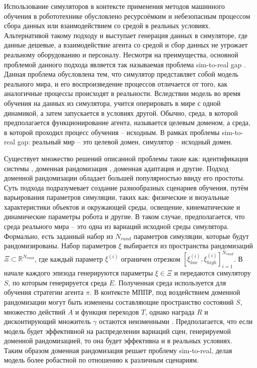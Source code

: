     Использование симуляторов в контексте применения методов машинного
    обучения в робототехнике обусловлено ресурсоёмким и небезопасным
    процессом сбора данных или взаимодействием со средой в реальных условиях. Альтернативой такому подходу и выступает генерация данных в симуляторе, где данные дешевые, а взаимодействие агента со средой и сбор данных не угрожает реальному оборудованию и персоналу. Несмотря на преимущества, основной проблемой данного подхода является так называемая проблема sim-to-real gap \cite{he2023bridging}. Данная проблема обусловлена тем, что симулятор представляет собой модель реального мира, и его воспроизведение процессов отличается от того, как аналогичные процессы происходят в реальности. Вследствии модель во время обучения на данных из симулятора, учится оперировать в мире с одной динамикой, а затем запускается в условиях другой. Обычно, среда, в которой предполагается функционирование агента, называется целевым доменом, а среда, в которой проходил процесс обучения -- исходным. В рамках проблемы sim-to-real gap: реальный мир -- это целевой домен, симулятор -- исходный домен.  

    Существует множество решений описанной проблемы такие как: идентификация системы \cite{sontakke2023residual}, доменная рандомизация \cite{dai2022analysing, shakerimov2023efficient}, доменная адаптация \cite{shakerimov2023efficient} и другие. Подход доменной рандомизации обладает большей популярностью ввиду его простоты. Суть подхода подразумевает создание разнообразных сценариев обучения, путём варьирования параметров симуляции, таких как: физические и визуальные характеристики объектов и окружающей среды, освещение, кинематические и динамические параметры робота и другие. В таком случае, предполагается, что среда реального мира -- это одна из вариаций исходной среды симулятора. Формально, есть заданный набор из $N_{rand}$ параметров симуляции, которые будут рандомизированы. Набор параметров $\xi$ выбирается из пространства рандомизаций $\Xi \subset \mathbb{R}^{N_{rand}}$, где каждый параметр $\xi^{(i)}$ ограничен отрезком $\left[ \xi^{(i)}_{low}, \xi^{(i)}_{high} \right]^{N_{rand}}_{i=1}$. В начале каждого эпизода генерируются параметры $\xi \in \Xi$ и передаются симулятору $S$, по которым генерируется среда $E$. Полученная среда используется для обучения стратегии агента $\pi$. В контексте МППР, под воздействием доменной рандомизации могут быть изменены составляющие пространство состояний $S$, множество действий $A$ и функция переходов $T$, однако награда $R$ и дисконтирующий множитель $\gamma$ остаются неизменными \cite{mehta2020active}. Предполагается, что если модель будет эффективной на распределении вариаций сцен, генерируемой доменной рандомизацией, то она будет эффективна и в реальных условиях. Таким образом доменная рандомизация решает проблему sim-to-real, делая модель более робастной по отношению к различным сценариям.  

